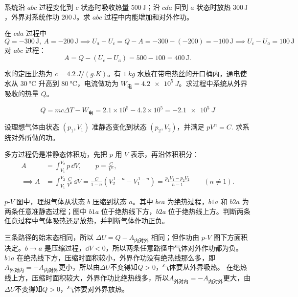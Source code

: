 \documentclass[lang=cn,11pt]{elegantbook}
\begin{document}
\begin{exercise}
    系统沿 \(abc\) 过程变化到 \(c\) 状态时吸收热量 \(500\,\text{J}\)；沿 \(cda\) 回到 \(a\) 状态时放热 \(300\,\text{J}\)，外界对系统作功 \(200\,\text{J}\)。求 \(abc\) 过程中内能增加和对外作功。
\end{exercise}
\begin{solution}
在 \(cda\) 过程中
\[Q=-300\,\text{J},~A=-200\,\text{J}\implies U_a-U_c=Q-A=-300-(-200)=-100\,\text{J}\implies U_c-U_a=100\,\text{J}\]对 \(abc\) 过程：\[A=Q-(U_c-U_a)=500-100=400\,\text{J}.\]
\end{solution}


\begin{exercise}[电热丝加热开口水桶时怎样给 \(Q\) 判号]
水的定压比热为 \(c=\SI{4.2}{J/(g.K)}\)。有 \(\SI{1}{kg}\) 水放在带电热丝的开口桶内，通电使水从 \(\SI{30}{\celsius}\) 升高到 \(\SI{80}{\celsius}\)，电流做功为 \(W_{\text{电}}=\SI{4.2e5}{J}\)。求过程中系统从外界吸收的热量 \(Q\)。
\end{exercise}

\begin{solution}
 \[Q=mc\Delta T-W_{\text{电}} =2.1\times10^5-4.2\times10^5 =-\SI{2.1e5}{J}\]
\end{solution}

\begin{exercise}[多方关系下的准静态体积功]
设理想气体由状态 \((p_1,V_1)\) 准静态变化到状态 \((p_2,V_2)\)，并满足
 \(pV^n=C.\) 
求系统对外所做的功。
\end{exercise}

\begin{solution}
多方过程仍是准静态体积功，先把 \(p\) 用 \(V\) 表示，再沿体积积分：
\[
\begin{aligned}
A&=\int_{V_1}^{V_2}p\,\dd V,\qquad p=\frac{C}{V^n},\\
\implies A&=\int_{V_1}^{V_2}\frac{C}{V^n}\,\dd V
=\frac{C}{1-n}\left(V_2^{\,1-n}-V_1^{\,1-n}\right)=\frac{p_1V_1-p_2V_2}{n-1}\qquad (n\neq1).
\end{aligned}
\]
\end{solution}

\begin{exercise}
\(p\)-\(V\) 图中，理想气体从状态 \(b\) 压缩到状态 \(a\)。其中 \(bca\) 为绝热过程，\(b1a\) 和 \(b2a\) 为两条任意准静态过程；图中 \(b1a\) 位于绝热线下方，\(b2a\) 位于绝热线上方。判断两条任意过程中气体吸热还是放热，并判断气体作功正负。
\end{exercise}

\begin{solution}
三条路径的始末态相同，所以 \(\Delta U=Q-A_{\text{内对外}}\) 相同；但作功由 \(p\)-\(V\) 图下方面积决定。\(b\to a\) 是压缩过程，\(\dd V<0\)，所以两条任意路径中气体对外作功都为负。\(b1a\) 在绝热线下方，压缩时面积较小，外界作功没有绝热线那么多，即$A_{\text{外对内}}=-A_{\text{内对外}}$更小，所以由$\Delta U$不变得知$Q>0$，气体要从外界吸热。 在绝热线上方，压缩时面积较大，外界作功比绝热线多，所以$A_{\text{外对内}}=-A_{\text{内对外}}$更大，由$\Delta U$不变得知$Q>0$，气体要对外界放热。
\end{solution}
\end{document}
